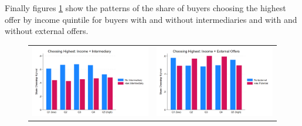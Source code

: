 \documentclass[12pt]{article}
\begin{document}
Finally figures \ref{fig:ie4_12and13} show the patterns of the share of buyers choosing the highest offer by income quintile for buyers with and without intermediaries and with and without external offers.
  \begin{figure}[H]
\caption{}
 \label{fig:ie4_12and13}
\centering{}%
\begin{tabular}{cc}
\includegraphics[scale=0.17]{figures/IE4/IE4_highest_income_intermediary.png} & \includegraphics[scale=0.17]{figures/IE4/IE4_highest_income_external.png} 
\end{tabular}
\end{figure} 



\end{document}
